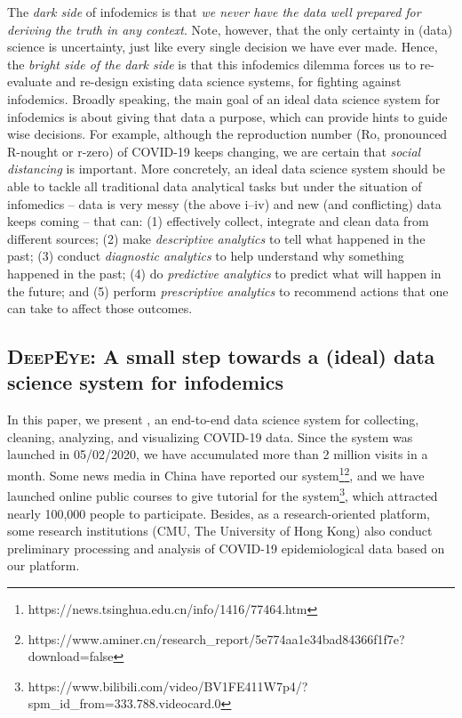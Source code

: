 The {\em dark side} of infodemics is that {\em we never have the data well prepared for deriving the truth in any context}. Note, however, that the only certainty in (data) science is uncertainty, just like every single decision we have ever made. Hence, the {\em bright side of the dark side} is that this infodemics dilemma forces us to re-evaluate and re-design existing data science systems, for fighting against infodemics.
%
Broadly speaking, the main goal of an ideal data science system for infodemics is about giving that data a purpose, which can provide hints to guide wise decisions. For example, although the reproduction number (Ro, pronounced R-nought or r-zero) of COVID-19 keeps changing, we are certain that {\em social distancing} is important. 
%
More concretely, an ideal data science system should be able to tackle all traditional data analytical tasks but under the situation of infomedics -- data is very messy (the above i--iv) and new (and conflicting) data keeps coming -- that can:
(1) effectively collect, integrate and clean data from different sources;
(2) make {\em descriptive analytics} to tell what happened in the past; 
(3) conduct {\em diagnostic analytics} to help understand why something happened in the past; 
(4) do {\em predictive analytics} to predict what will happen in the future; and 
(5) perform {\em prescriptive analytics} to recommend actions that one can take to affect those outcomes.


\subsection{\textsc{DeepEye}: A small step towards a (ideal) data science system for infodemics}

In this paper, we present \sys, an end-to-end data science system for collecting, cleaning, analyzing, and visualizing COVID-19 data. Since the system was launched in {05/02/2020}, we have accumulated more than 2 million visits in a month. Some news media in China have reported our system\footnote{https://news.tsinghua.edu.cn/info/1416/77464.htm}\footnote{https://www.aminer.cn/research\_report/5e774aa1e34bad84366f1f7e?download=false}, and we have launched online public courses to give tutorial for the system\footnote{https://www.bilibili.com/video/BV1FE411W7p4/?spm\_id\_from=333.788.videocard.0}, which attracted nearly 100,000 people to participate. 
Besides, as a research-oriented platform, some research institutions (\eg CMU, The University of Hong Kong) also conduct preliminary processing and analysis of COVID-19 epidemiological data based on our platform.

